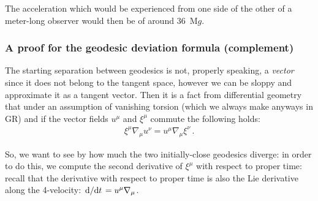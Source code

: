 \documentclass[main.tex]{subfiles}
\begin{document}
The acceleration which would be experienced from one side of the other of a meter-long observer would then be of around \SI{36}{M}\(g\). 

\subsubsection{A proof for the geodesic deviation formula (complement)}

The starting separation between geodesics is not, properly speaking, a \emph{vector} since it does not belong to the tangent space, however we can be sloppy and approximate it as a tangent vector.
Then it is a fact from differential geometry that under an assumption of vanishing torsion (which we always make anyways in GR) and if the vector fields \(u^{\mu }\) and \(\xi^{\mu }\) commute the following holds: 
%
\begin{align} \label{eq:lie-bracket-commutation}
  \xi^{\mu } \nabla_{\mu } u^{\nu } = u^{\mu } \nabla_{\mu } \xi^{\nu }
\,.
\end{align}


So, we want to see by how much the two initially-close geodesics diverge: in order to do this, we compute the second derivative of \(\xi^{\mu }\) with respect to proper time: recall that the derivative with respect to proper time is also the Lie derivative along the 4-velocity: \(\dv*{}{t} = u^{\mu } \nabla_{\mu }\). 
\end{document}
